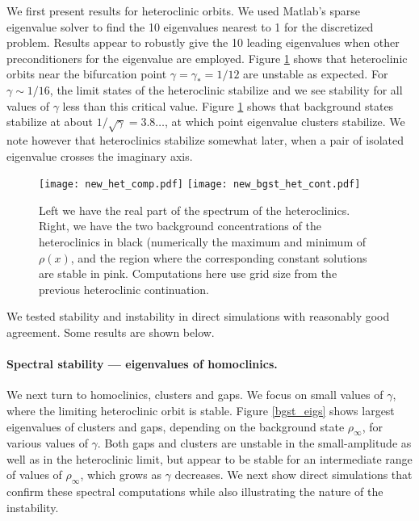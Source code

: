 \documentclass[10pt]{article}
\begin{document}
We first present results for heteroclinic orbits. We used Matlab's sparse eigenvalue solver to find the 10 eigenvalues nearest to 1 for the discretized problem. Results appear to robustly give the 10 leading eigenvalues when other preconditioners for the eigenvalue are employed. Figure \ref{hetstab} shows that heteroclinic orbits near the bifurcation point $\gamma=\gamma_*=1/12$ are unstable as expected. For $\gamma\sim 1/16$, the limit states of the heteroclinic stabilize and we see stability for all values of $\gamma$ less than this critical value. Figure \ref{hetstab} shows that background states stabilize at about $1/\sqrt{\gamma}=3.8\ldots$, at which point eigenvalue clusters stabilize. We note however that heteroclinics stabilize somewhat later, when a pair of isolated eigenvalue crosses the imaginary axis. 
\begin{figure}[H]
\centering
\texttt{[image: new\_het\_comp.pdf]}
\hspace{1cm}
\texttt{[image: new\_bgst\_het\_cont.pdf]}
\caption{Left we have the real part of the spectrum of the heteroclinics.  Right, we have the two background concentrations of the heteroclinics in black (numerically the maximum and minimum of $\rho(x)$, and the region where the corresponding constant solutions are stable in pink. Computations here use grid size from the  previous heteroclinic continuation.}
 \label{hetstab}
\end{figure}
%
We tested stability and instability in direct simulations with reasonably good agreement. Some results are shown below.




\paragraph{Spectral stability --- eigenvalues of homoclinics.}
We next turn to homoclinics, clusters and gaps. We focus on small values of $\gamma$, where the limiting heteroclinic orbit is stable. Figure \ref{bgst_eigs} shows largest eigenvalues of clusters and gaps, depending on the background state $\rho_\infty$, for various values of $\gamma$. Both gaps and clusters are unstable  in the small-amplitude as well as in the heteroclinic limit, but appear to be stable for an intermediate range of values of $\rho_\infty$, which grows as $\gamma$ decreases. We next show direct simulations that confirm these spectral computations while also illustrating the nature of the instability. 
\end{document}
